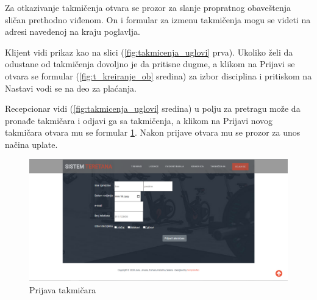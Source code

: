 \documentclass[../main.tex]{subfiles}
\begin{document}
Za otkazivanje takmičenja otvara se prozor za slanje propratnog obaveštenja sličan prethodno viđenom. On i formular za izmenu takmičenja mogu se videti na adresi navedenoj na kraju poglavlja.

Klijent vidi prikaz kao na slici (\ref{fig:takmicenja_uglovi} prva). Ukoliko želi da odustane od takmičenja dovoljno je da pritisne dugme, a klikom na Prijavi se otvara se formular (\ref{fig:t_kreiranje_ob} sredina) za izbor disciplina i pritiskom na Nastavi vodi se na deo za plaćanja. 

Recepcionar vidi (\ref{fig:takmicenja_uglovi} sredina) u polju za pretragu može da pronađe takmičara i odjavi ga sa takmičenja, a klikom na Prijavi novog takmičara otvara mu se formular \ref{fig:t_prijaviT}. Nakon prijave otvara mu se prozor za unos načina uplate.

\begin{figure}[!ht]
\begin{center}
\includegraphics[scale=0.30]{sections/korisnicki_interfejs/screenshots/takmicenja_prijavi_takmicara.PNG}
\end{center}
\caption{Prijava takmičara}
\label{fig:t_prijaviT}
\end{figure}
\end{document}
